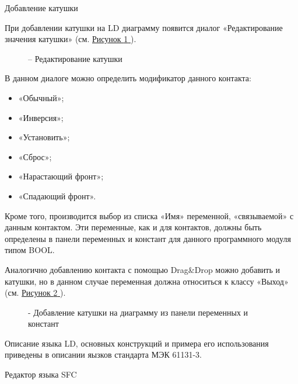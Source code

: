 \documentclass[letterpaper,10pt,russian]{sphinxmanual}
\begin{document}
Добавление катушки

При добавлении катушки на LD диаграмму появится диалог «Редактирование
значения катушки» (см. \hyperref[usage_guide/ide_components:image80]{Рисунок \ref{usage_guide/ide_components:image80} }).
\begin{figure}[htbp]
\centering
\capstart

\noindent{}
\caption{– Редактирование катушки}\label{usage_guide/ide_components:image80}\end{figure}

В данном диалоге можно определить модификатор данного контакта:
\begin{itemize}
\item {} 
«Обычный»;

\item {} 
«Инверсия»;

\item {} 
«Установить»;

\item {} 
«Сброс»;

\item {} 
«Нарастающий фронт»;

\item {} 
«Спадающий фронт».

\end{itemize}

Кроме того, производится выбор из списка «Имя» переменной, «связываемой»
с данным контактом. Эти переменные, как и для контактов, должны быть
определены в панели переменных и констант для данного программного
модуля типом BOOL.

Аналогично добавлению контакта с помощью Drag\&Drop можно добавить и
катушки, но в данном случае переменная должна относиться к классу
«Выход» (см. \hyperref[usage_guide/ide_components:image81]{Рисунок \ref{usage_guide/ide_components:image81} }).
\begin{figure}[htbp]
\centering
\capstart

\noindent{}
\caption{- Добавление катушки на диаграмму из панели переменных и констант}\label{usage_guide/ide_components:image81}\end{figure}

Описание языка LD, основных конструкций и примера его использования
приведены в описании яызков стандарта МЭК 61131-3.

Редактор языка SFC
\end{document}
